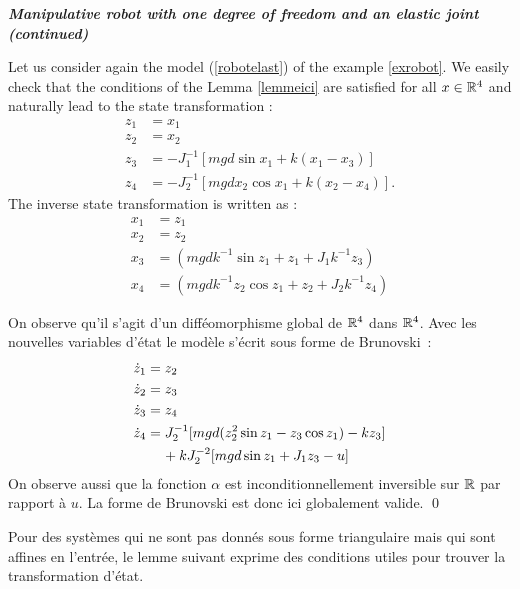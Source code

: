 \begin{exemple}{\bf \em Manipulative robot with one degree of freedom and an elastic joint (continued)}

Let us consider again the model (\ref{robotelast}) of the example \ref{exrobot}. We easily check that the conditions of the Lemma \ref{lemmeici} are satisfied for all $x \in \mathbb{R}^4$ and naturally lead to the state transformation :
\begin{equation*} \begin{split} 
z_1 &= x_1 \\
z_2 &= x_2 \\
z_3 &= -J_1^{-1}[mgd\sin x_1 + k(x_1 -x_3)] \\
z_4 &= -J_2^{-1}[mgdx_2 \cos x_1 + k(x_2 - x_4)].
\end{split} \end{equation*}
The inverse state transformation is written as :
\begin{equation*} \begin{split} 
x_1 &= z_1 \\
x_2 &= z_2 \\
x_3 &= (mgdk^{-1} \sin z_1 + z_1 + J_1k^{-1}z_3) \\
x_4 &= (mgdk^{-1} z_2 \cos z_1 + z_2 + J_2k^{-1}z_4) 
\end{split} \end{equation*}

On observe qu'il s'agit d'un difféomorphisme global de $\mathbb{R}^4$ dans $\mathbb{R}^4$. Avec les nouvelles variables d'état le modèle s'écrit sous forme de Brunovski~:
\begin{equation*} \begin{split} 
\dot z_1 &= z_2 \\
\dot z_2 &= z_3 \\
\dot z_3 &= z_4 \\
\dot z_4 &= J_2^{-1}[mgd(z_2^2 \sin z_1 - z_3 \cos z_1) -k z_3] \\ & \hh \hh + kJ_2^{-2}[mgd\sin z_1 + J_1z_3 - u]
\end{split} \end{equation*}
On observe aussi que la fonction $\alpha$ est inconditionnellement inversible sur $\mathbb{R}$ par rapport à $u$. La forme de Brunovski est donc ici globalement valide. \qed
\end{exemple}
Pour des systèmes qui ne sont pas donnés sous forme triangulaire mais qui sont affines en l'entrée, le lemme suivant exprime des conditions utiles pour trouver la transformation d'état.
